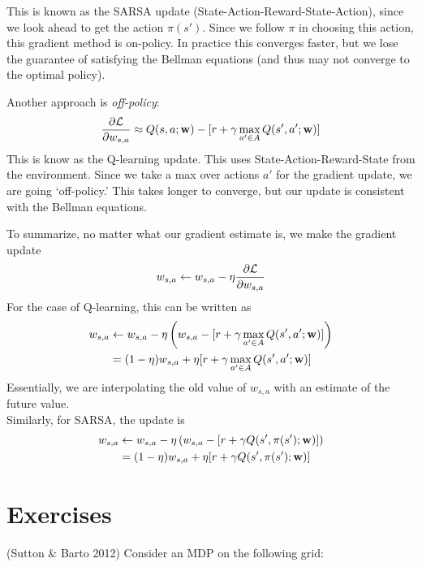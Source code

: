 \documentclass[12pt]{article}
\begin{document}
This is known as the SARSA update (State-Action-Reward-State-Action), since we look ahead to get the action $\pi(s')$. Since we follow $\pi$ in choosing this action, this gradient method is on-policy. In practice this converges faster, but we lose the guarantee of satisfying the Bellman equations (and thus may not converge to the optimal
policy).

Another approach is \emph{off-policy}:
\begin{equation}
\frac{\partial \mathcal{L}}{\partial w_{s,a}} \approx Q(s,a;\mathbf{w}) - [r + \gamma \max_{a' \in A} Q(s', a'; \mathbf{w})]
\end{equation}
This is know as the Q-learning update. This uses State-Action-Reward-State from
the environment. Since we take a max over actions $a'$ for the gradient update, we are going `off-policy.' This takes longer to converge, but our update is consistent with the Bellman equations.

To summarize, no matter what our gradient estimate is, we make the gradient update
\begin{equation}
w_{s,a} \gets w_{s,a} - \eta \frac{\partial\mathcal{L}}{\partial w_{s,a}}
\end{equation}
For the case of Q-learning, this can be written as
\begin{align}
w_{s,a} &\gets w_{s,a} - \eta \left( w_{s,a} - [r + \gamma \max_{a' \in A} Q(s', a'; \mathbf{w})] \right) \\
&= (1-\eta) w_{s,a} + \eta  [r + \gamma \max_{a' \in A} Q(s', a'; \mathbf{w})]
\end{align}
Essentially, we are interpolating the old value of $w_{s,a}$ with an estimate of the future value.\\

\noindent Similarly, for SARSA, the update is
\begin{align}
w_{s,a} &\gets w_{s,a} - \eta \left( w_{s,a} - [r + \gamma  Q(s', \pi(s'); \mathbf{w})] \right) \\
&= (1-\eta) w_{s,a} + \eta  [r + \gamma  Q(s', \pi(s'); \mathbf{w})]
\end{align}

\section{Exercises}

(Sutton \& Barto 2012) Consider an MDP on the following grid:

\begin{center}
\end{center}
\end{document}
